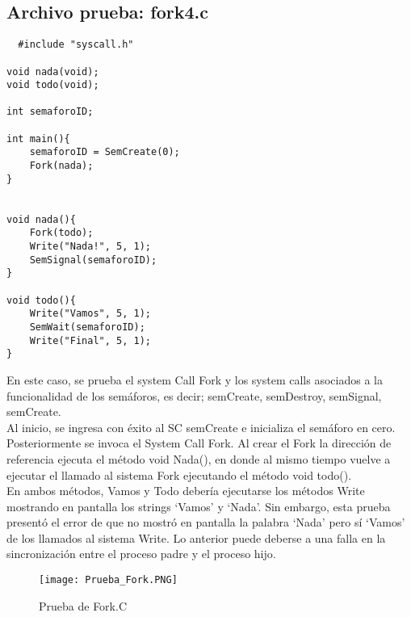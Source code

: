 \subsection{Archivo prueba: fork4.c}
\begin{lstlisting}
  #include "syscall.h"

void nada(void);
void todo(void);

int semaforoID;

int main(){
	semaforoID = SemCreate(0);
	Fork(nada);
}


void nada(){
	Fork(todo);
	Write("Nada!", 5, 1);
	SemSignal(semaforoID);
}

void todo(){
	Write("Vamos", 5, 1);
	SemWait(semaforoID);
	Write("Final", 5, 1);
}
\end{lstlisting}
En este caso, se prueba el system Call Fork y los system calls asociados a la funcionalidad de los semáforos, es decir; semCreate, semDestroy, semSignal, semCreate. \\
Al inicio, se ingresa con éxito al SC semCreate e inicializa el semáforo en cero. Posteriormente se invoca el System Call Fork. Al crear el Fork la dirección de referencia ejecuta el método void Nada(), en donde al mismo tiempo vuelve a ejecutar el llamado al sistema Fork  ejecutando el método void todo(). \\
En ambos métodos, Vamos y Todo debería ejecutarse los métodos Write mostrando en pantalla los strings ‘Vamos’ y ‘Nada’. Sin embargo, esta prueba presentó el error de que no mostró en pantalla la palabra ‘Nada’ pero sí ‘Vamos’ de los llamados al sistema Write. Lo anterior puede deberse a una falla en la sincronización entre el proceso padre y el proceso hijo.
    \begin{figure}[hbt]
      \begin{center}
        \texttt{[image: Prueba\_Fork.PNG]}
        \caption{Prueba de Fork.C}
        \label{fig:Fork}
      \end{center}
    \end{figure}
